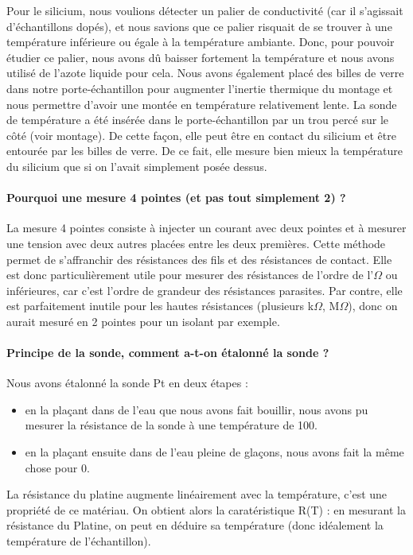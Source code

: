 Pour le silicium, nous voulions détecter un palier de conductivité (car il s'agissait d'échantillons dopés), et nous savions que ce palier risquait de se trouver à une température inférieure ou égale à la température ambiante.
Donc, pour pouvoir étudier ce palier, nous avons dû baisser fortement la température et nous avons utilisé de l'azote liquide pour cela.
Nous avons également placé des billes de verre dans notre porte-échantillon pour augmenter l'inertie thermique du montage et nous permettre d'avoir une montée en température relativement lente.
La sonde de température a été insérée dans le porte-échantillon par un trou percé sur le côté (voir montage). De cette façon, elle peut être en contact du silicium et être entourée par les billes de verre.
De ce fait, elle mesure bien mieux la température du silicium que si on l'avait simplement posée dessus.


\paragraph{Pourquoi une mesure 4 pointes (et pas tout simplement 2) ?}
La mesure 4 pointes consiste à injecter un courant avec deux pointes et à mesurer une tension avec deux autres placées entre les deux premières.
Cette méthode permet de s'affranchir des résistances des fils et des résistances de contact.
Elle est donc particulièrement utile pour mesurer des résistances de l'ordre de l'$\Omega$ ou inférieures, car c'est l'ordre de grandeur des résistances parasites.
Par contre, elle est parfaitement inutile pour les hautes résistances (plusieurs k$\Omega$, M$\Omega$), donc on aurait mesuré en 2 pointes pour un isolant par exemple.


\paragraph{Principe de la sonde, comment a-t-on étalonné la sonde ?}
Nous avons étalonné la sonde Pt en deux étapes :


\begin{itemize}
  \item en la plaçant dans de l'eau que nous avons fait bouillir, nous avons pu mesurer la résistance de la sonde à une température de 100\celsius{}.
  \item en la plaçant ensuite dans de l'eau pleine de glaçons, nous avons fait la même chose pour 0\celsius{}.
\end{itemize}


La résistance du platine augmente linéairement avec la température, c'est une propriété de ce matériau.
On obtient alors la caratéristique R(T) : en mesurant la résistance du Platine, on peut en déduire sa température (donc idéalement la température de l'échantillon).


